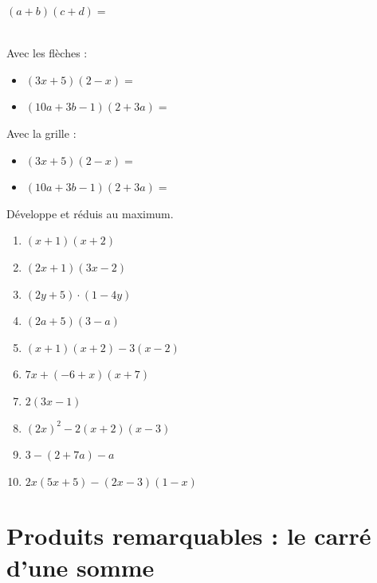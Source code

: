 \documentclass[../math2.tex]{subfiles}
\begin{document}

$\left(a+b\right)\left(c+d\right)=$
\vspace*{2cm}

\exemples \\
Avec les flèches :
\begin{itemize}[cols=2, label=, leftmargin=0pt]
  \item $\left(3x+5\right)\left(2-x\right)=$
  \item $\left(10a+3b-1\right)\left(2+3a\right)=$
\end{itemize}
\vspace*{2cm}

Avec la grille :
\begin{itemize}[cols=2,label=, leftmargin=0pt]
  \item $\left(3x+5\right)\left(2-x\right)=$
  \item $\left(10a+3b-1\right)\left(2+3a\right)=$
\end{itemize}
\vspace*{6cm}

\newpage
\begin{exercise}
  Développe et réduis au maximum.
  \begin{enumerate}[cols=2]
    \item  $\left(x+1\right)\left(x+2\right)$
    \item  $\left(2x+1\right)\left(3x-2\right)$
    \item  $\left(2y+5\right)\cdot\left(1-4y\right)$
    \item  $\left(2a+5\right)\left(3-a\right)$
    \item  $\left(x+1\right)\left(x+2\right)-3\left(x-2\right)$
    \item  $7x+\left(-6+x\right)\left(x+7\right)$
    \item  $2\left(3x-1\right)$
    \item  $\left(2x\right)^2-2\left(x+2\right)\left(x-3\right)$
    \item  $3-\left(2+7a\right)-a$
    \item  $2x\left(5x+5\right)-\left(2x-3\right)\left(1-x\right)$
  \end{enumerate}
\end{exercise}

\newpage
\section{Produits remarquables : le carré d'une somme}
\end{document}
